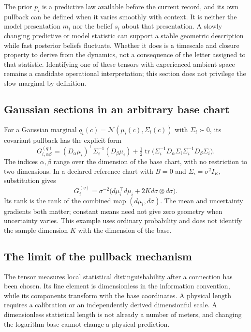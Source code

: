 The prior $p_i$ is a predictive law available before the current record, and its own pullback can be defined when it varies smoothly with context. It is neither the model presentation $m_i$ nor the belief $s_i$ about that presentation. A slowly changing predictive or model statistic can support a stable geometric description while fast posterior beliefs fluctuate. Whether it does is a timescale and closure property to derive from the dynamics, not a consequence of the letter assigned to that statistic. Identifying one of these tensors with experienced ambient space remains a candidate operational interpretation; this section does not privilege the slow marginal by definition.

\subsection{Gaussian sections in an arbitrary base chart}

For a Gaussian marginal $q_i(c)=\mathcal N(\mu_i(c),\Sigma_i(c))$ with $\Sigma_i\succ0$, its covariant pullback has the explicit form
\begin{equation}
G^{(q)}_{i,\alpha\beta}
=(D_\alpha\mu_i)^\top\Sigma_i^{-1}(D_\beta\mu_i)
+\tfrac12\operatorname{tr}\bigl(\Sigma_i^{-1}D_\alpha\Sigma_i\Sigma_i^{-1}D_\beta\Sigma_i\bigr).
\label{eq:gaussian_base_fisher}
\end{equation}
The indices $\alpha,\beta$ range over the dimension of the base chart, with no restriction to two dimensions. In a declared reference chart with $B=0$ and $\Sigma_i=\sigma^2I_K$, substitution gives
\begin{equation}
G_i^{(q)}=\sigma^{-2}\bigl(d\mu_i^\top d\mu_i+2Kd\sigma\otimes d\sigma\bigr).
\label{eq:isotropic_base_fisher}
\end{equation}
Its rank is the rank of the combined map $(d\mu_i,d\sigma)$. The mean and uncertainty gradients both matter; constant means need not give zero geometry when uncertainty varies. This example uses ordinary probability and does not identify the sample dimension $K$ with the dimension of the base.

\subsection{The limit of the pullback mechanism}

The tensor measures local statistical distinguishability after a connection has been chosen. Its line element is dimensionless in the information convention, while its components transform with the base coordinates. A physical length requires a calibration or an independently derived dimensionful scale. A dimensionless statistical length is not already a number of meters, and changing the logarithm base cannot change a physical prediction.


